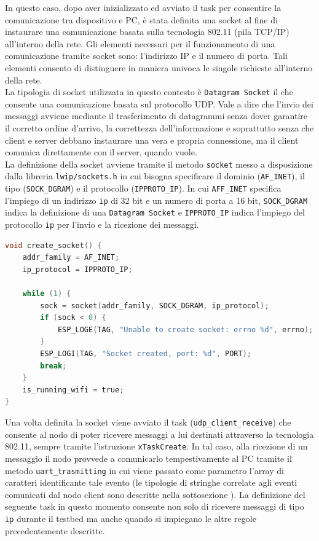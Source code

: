 \noindent In questo caso, dopo aver inizializzato ed avviato il task per consentire la comunicazione tra dispositivo e PC, è stata definita una socket al fine di instaurare una comunicazione basata sulla tecnologia 802.11 (pila TCP/IP) all’interno della rete. Gli elementi necessari per il funzionamento di una comunicazione tramite socket sono: l'indirizzo IP e il numero di porta. Tali elementi consento di distinguere in maniera univoca le singole richieste all'interno della rete.\\
La tipologia di socket utilizzata in questo contesto è \texttt{Datagram Socket} il che consente una comunicazione basata sul protocollo UDP. Vale a dire che l'invio dei messaggi avviene mediante il trasferimento di datagrammi senza dover garantire il corretto ordine d'arrivo, la correttezza dell'informazione e soprattutto senza che client e server debbano instaurare una vera e propria connessione, ma il client comunica direttamente con il server, quando vuole.\\

\noindent La definizione della socket avviene tramite il metodo \texttt{socket} messo a disposizione dalla libreria \texttt{lwip/sockets.h} in cui bisogna specificare il dominio (\texttt{AF\_INET}), il tipo (\texttt{SOCK\_DGRAM}) e il protocollo (\texttt{IPPROTO\_IP}). In cui \texttt{AFF\_INET} specifica l'impiego di un indirizzo \texttt{ip} di 32 bit e un numero di porta a 16 bit, \texttt{SOCK\_DGRAM} indica la definizione di una \texttt{Datagram Socket} e \texttt{IPPROTO\_IP} indica l'impiego del protocollo \texttt{ip} per l'invio e la ricezione dei messaggi.\\

\begin{lstlisting}[language=C, caption= creazione della socket]
void create_socket() {
    addr_family = AF_INET;
    ip_protocol = IPPROTO_IP;

    while (1) {
        sock = socket(addr_family, SOCK_DGRAM, ip_protocol);
        if (sock < 0) {
            ESP_LOGE(TAG, "Unable to create socket: errno %d", errno);
        }
        ESP_LOGI(TAG, "Socket created, port: %d", PORT);
        break;
    }
    is_running_wifi = true;
}
\end{lstlisting}

\noindent Una volta definita la socket viene avviato il task (\texttt{udp\_client\_receive}) che consente al nodo di poter ricevere messaggi a lui destinati attraverso la tecnologia 802.11, sempre tramite l'istruzione \texttt{xTaskCreate}. In tal caso, alla ricezione di un messaggio il nodo provvede a comunicarlo tempestivamente al PC tramite il metodo \texttt{uart\_trasmitting} in cui viene passato come parametro l'array di caratteri identificante tale evento (le tipologie di stringhe correlate agli eventi comunicati dal nodo client sono descritte nella sottosezione ). La definizione del seguente task in questo momento consente non solo di ricevere messaggi di tipo \texttt{ip} durante il testbed ma anche quando si impiegano le altre regole precedentemente descritte.\\

